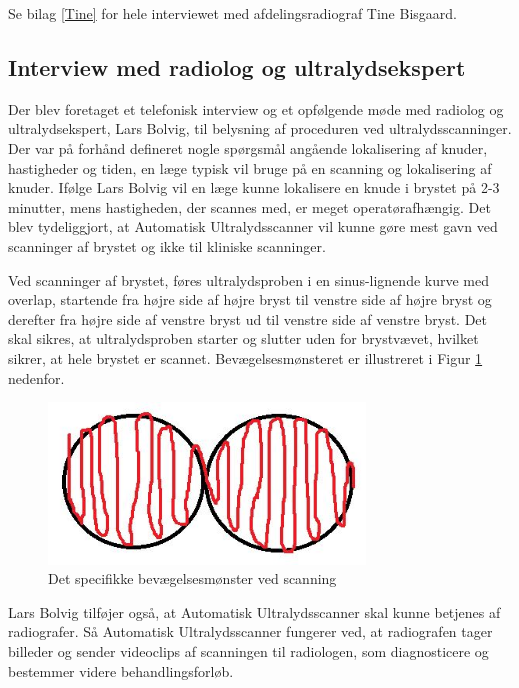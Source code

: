 Se bilag \ref{Tine} for hele interviewet med afdelingsradiograf Tine Bisgaard. 

\subsection{Interview med radiolog og ultralydsekspert}
Der blev foretaget et telefonisk interview og et opfølgende møde med radiolog og ultralydsekspert, Lars Bolvig, til belysning af proceduren ved ultralydsscanninger. Der var på forhånd defineret nogle spørgsmål angående lokalisering af knuder, hastigheder og tiden, en læge typisk vil bruge på en scanning og lokalisering af knuder. Ifølge Lars Bolvig vil en læge kunne lokalisere en knude i brystet på 2-3 minutter, mens hastigheden, der scannes med, er meget operatørafhængig. Det blev tydeliggjort, at Automatisk Ultralydsscanner vil kunne gøre mest gavn ved scanninger af brystet og ikke til kliniske scanninger. 

Ved scanninger af brystet, føres ultralydsproben i en sinus-lignende kurve med overlap, startende fra højre side af højre bryst til venstre side af højre bryst og derefter fra højre side af venstre bryst ud til venstre side af venstre bryst. Det skal sikres, at ultralydsproben starter og slutter uden for brystvævet, hvilket sikrer, at hele brystet er scannet. Bevægelsesmønsteret er illustreret i Figur \ref{Probensbevagelse} nedenfor. 

\begin{figure}[H]
    \centering
    \includegraphics[width=0.75\textwidth]{figurer/d/probebevagelse}
    \caption{Det specifikke bevægelsesmønster ved scanning}
    \label{Probensbevagelse}
\end{figure}

Lars Bolvig tilføjer også, at Automatisk Ultralydsscanner skal kunne betjenes af radiografer. Så Automatisk Ultralydsscanner fungerer ved, at radiografen tager billeder og sender videoclips af scanningen til radiologen, som diagnosticere og bestemmer videre behandlingsforløb.

